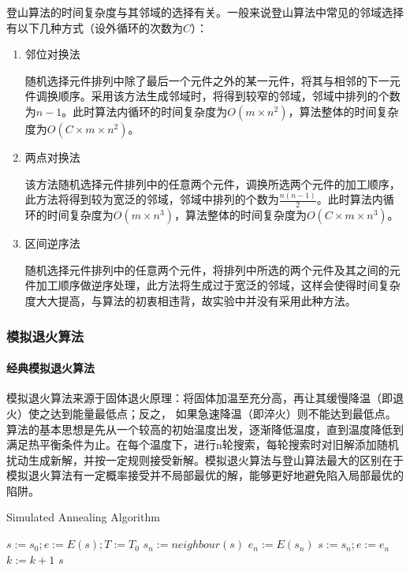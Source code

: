 \documentclass[UTF8]{ctexart}
\begin{document}
登山算法的时间复杂度与其邻域的选择有关。一般来说登山算法中常见的邻域选择有以下几种方式（设外循环的次数为\(C\)）：

\begin{enumerate}
	\def\labelenumi{\arabic{enumi}.}
	\item
	邻位对换法
	
	随机选择元件排列中除了最后一个元件之外的某一元件，将其与相邻的下一元件调换顺序。采用该方法生成邻域时，将得到较窄的邻域，邻域中排列的个数为\(n-1\)。此时算法内循环的时间复杂度为\(O(m\times n^2)\)，算法整体的时间复杂度为\(O(C\times m \times n^2)\)。
	\item
	两点对换法
	
	该方法随机选择元件排列中的任意两个元件，调换所选两个元件的加工顺序，此方法将得到较为宽泛的邻域，邻域中排列的个数为\(\frac{n(n-1)}{2}\)。此时算法内循环的时间复杂度为\(O(m\times n^3)\)，算法整体的时间复杂度为\(O(C\times m \times n^3)\)。
	\item
	区间逆序法
	
	随机选择元件排列中的任意两个元件，将排列中所选的两个元件及其之间的元件加工顺序做逆序处理，此方法将生成过于宽泛的邻域，这样会使得时间复杂度大大提高，与算法的初衷相违背，故实验中并没有采用此种方法。
\end{enumerate}

\subsubsection{模拟退火算法}
\paragraph{经典模拟退火算法}
模拟退火算法来源于固体退火原理：将固体加温至充分高，再让其缓慢降温（即退火）使之达到能量最低点；反之，
如果急速降温（即淬火）则不能达到最低点。算法的基本思想是先从一个较高的初始温度出发，逐渐降低温度，直到温度降低到满足热平衡条件为止。在每个温度下，进行n轮搜索，每轮搜索时对旧解添加随机扰动生成新解，并按一定规则接受新解。模拟退火算法与登山算法最大的区别在于模拟退火算法有一定概率接受并不局部最优的解，能够更好地避免陷入局部最优的陷阱。



\begin{algorithm}[t]
	\caption{Simulated Annealing Algorithm}
	\begin{algorithmic}[1]
		\STATE $s :=s_0;e:=E(s);T:=T_0$
		\STATE $s_n:=neighbour(s)$
		\STATE $e_n:=E(s_n)$
		\STATE $s:=s_n;e:=e_n$
		\ENDIF
		$k:=k+1$
		\ENDWHILE
		\RETURN $s$
	\end{algorithmic}
\end{algorithm}
\end{document}
